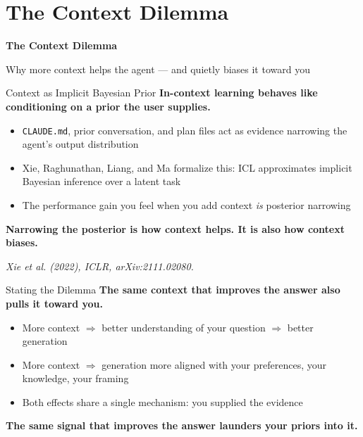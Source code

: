 \documentclass[10pt,english,aspectratio=169]{beamer}
\newcommand{\sectiondivider}[2]{%
\begin{frame}[plain,noframenumbering]
\begin{center}
\vfill
{\Large\textbf{#1}\par}
\vspace{0.35cm}
{\normalsize #2\par}
\vfill
\end{center}
\end{frame}
}
\begin{document}
\section{The Context Dilemma}

\sectiondivider{The Context Dilemma}{Why more context helps the agent --- and quietly biases it toward you}

\begin{frame}{Context as Implicit Bayesian Prior}
\textbf{In-context learning behaves like conditioning on a prior the user supplies.}

\vspace{0.25cm}

\begin{itemize}
    \item \texttt{CLAUDE.md}, prior conversation, and plan files act as evidence narrowing the agent's output distribution
    \item Xie, Raghunathan, Liang, and Ma formalize this: ICL approximates implicit Bayesian inference over a latent task
    \item The performance gain you feel when you add context \textit{is} posterior narrowing
\end{itemize}

\vspace{0.25cm}

\textbf{Narrowing the posterior is how context helps. It is also how context biases.}

\vspace{0.15cm}
{\scriptsize \textit{Xie et al. (2022), ICLR, arXiv:2111.02080.}}
\end{frame}

\begin{frame}{Stating the Dilemma}
\textbf{The same context that improves the answer also pulls it toward you.}

\vspace{0.25cm}

\begin{itemize}
    \item More context $\Rightarrow$ better understanding of your question $\Rightarrow$ better generation
    \item More context $\Rightarrow$ generation more aligned with your preferences, your knowledge, your framing
    \item Both effects share a single mechanism: you supplied the evidence
\end{itemize}

\vspace{0.3cm}

\textbf{The same signal that improves the answer launders your priors into it.}
\end{frame}
\end{document}
